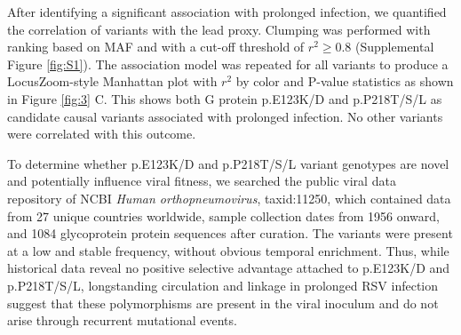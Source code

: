 \documentclass{article} %
\begin{document}
After identifying a significant association with prolonged infection,
we quantified the correlation of variants with the lead proxy.
Clumping was performed with ranking based on MAF and with a cut-off threshold of $r^2 \ge 0.8$ (Supplemental Figure \ref{fig:S1}).
The association model was repeated for all variants to produce a LocusZoom-style Manhattan plot with $r^2$ by color and P-value statistics as shown in 
Figure \ref{fig:3} C.
This shows both G protein 
p.E123K/D and 
p.P218T/S/L as candidate causal variants associated with prolonged infection. 
No other variants were correlated with this outcome. 


To determine whether p.E123K/D and p.P218T/S/L variant genotypes are novel and potentially influence viral fitness, we searched  the public viral data repository of NCBI \textit{Human orthopneumovirus}, taxid:11250, which contained data from 
27 unique countries worldwide, sample collection dates from 1956 onward, and 1084 glycoprotein protein sequences after curation.
The variants were present at a low and stable frequency, without obvious temporal enrichment. 
Thus, while historical data reveal no positive selective advantage attached to p.E123K/D and p.P218T/S/L, longstanding circulation and linkage in prolonged RSV infection suggest that these polymorphisms are present in the viral inoculum and do not arise through recurrent mutational events.
\end{document}
